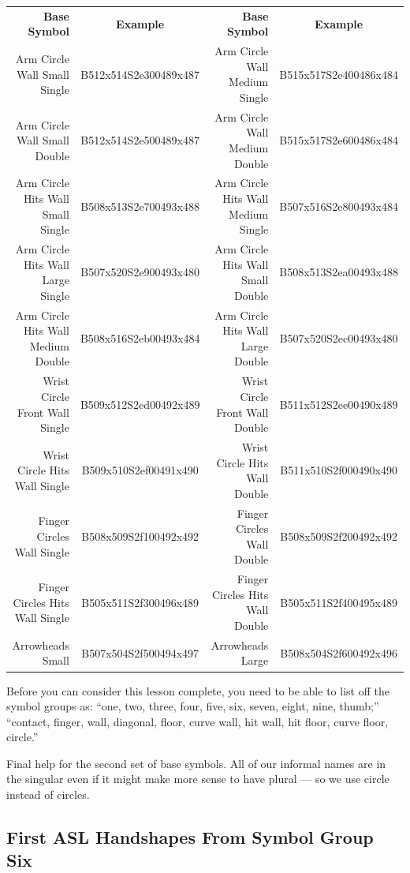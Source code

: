 \documentclass{article}
\begin{document}
\begin{center}
\begin{tabular}{rcrc}
\textbf{Base Symbol}&\textbf{Example}&\textbf{Base Symbol}&\textbf{Example}\\
Arm Circle Wall Small Single      &B512x514S2e300489x487&Arm Circle Wall Medium Single     &B515x517S2e400486x484\\
Arm Circle Wall Small Double      &B512x514S2e500489x487&Arm Circle Wall Medium Double     &B515x517S2e600486x484\\
Arm Circle Hits Wall Small Single &B508x513S2e700493x488&Arm Circle Hits Wall Medium Single&B507x516S2e800493x484\\
Arm Circle Hits Wall Large Single &B507x520S2e900493x480&Arm Circle Hits Wall Small Double &B508x513S2ea00493x488\\
Arm Circle Hits Wall Medium Double&B508x516S2eb00493x484&Arm Circle Hits Wall Large Double &B507x520S2ec00493x480\\
Wrist Circle Front Wall Single    &B509x512S2ed00492x489&Wrist Circle Front Wall Double    &B511x512S2ee00490x489\\
Wrist Circle Hits Wall Single     &B509x510S2ef00491x490&Wrist Circle Hits Wall Double     &B511x510S2f000490x490\\
Finger Circles Wall Single        &B508x509S2f100492x492&Finger Circles Wall Double        &B508x509S2f200492x492\\
Finger Circles Hits Wall Single   &B505x511S2f300496x489&Finger Circles Hits Wall Double   &B505x511S2f400495x489\\
Arrowheads Small                  &B507x504S2f500494x497&Arrowheads Large                  &B508x504S2f600492x496\\
\end{tabular}
\end{center}

Before you can consider this lesson complete, you need to be able to list off the symbol groups as:
``one, two, three, four, five, six, seven, eight, nine, thumb;''
``contact, finger, wall, diagonal, floor, curve wall, hit wall, hit floor, curve floor, circle.''

Final help for the second set of base symbols.
All of our informal names are in the singular even if it might make more sense to have plural --- so we use circle instead of circles.

\subsection{First ASL Handshapes From Symbol Group Six}
\end{document}
